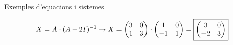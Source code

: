 \documentclass[11pt,a4paper]{article}
\newcommand{\fmdisp}[1]{\[\setbox2=\hbox{$\displaystyle #1$}\ifdim\wd2>\linewidth\resizebox{\linewidth}{!}{\box2}\else\box2\fi\]}
\begin{document}
\begin{fmex}{Exemples d'equacions i sistemes}
\begin{enumerate}[label=\textbf{\alph*)},leftmargin=*]
\fmdisp{X=A\cdot(A-2I)^{-1}\rightarrow X=\begin{pmatrix}3 & 0\\ 1 & 3\end{pmatrix}\cdot\begin{pmatrix}1 & 0\\ -1 & 1\end{pmatrix}=\boxed{\begin{pmatrix}3 & 0\\ -2 & 3\end{pmatrix}}}

\end{enumerate}
\end{fmex}
\end{document}
